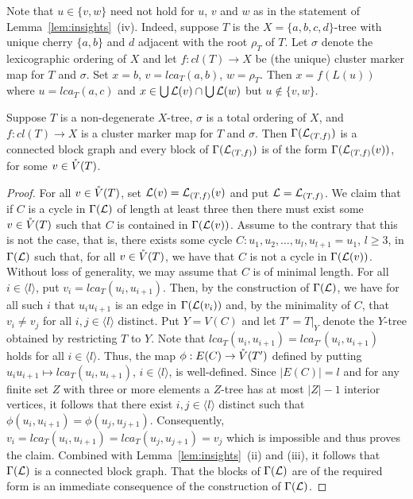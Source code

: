 Note that $u\in \{v,w\}$ need not hold for $u$, $v$ and $w$ as in the
statement of Lemma~\ref{lem:insights}~(iv).  Indeed, suppose $T$ is the
$X=\{a,b,c,d\}$-tree with unique cherry $\{a,b\}$ and $d$ adjacent with the
root $\rho_T$ of $T$. Let $\sigma$ denote the lexicographic ordering of $X$
and let $f:cl(T)\to X$ be (the unique) cluster marker map for $T$ and
$\sigma$.  Set $x=b$, $v=lca_T(a,b)$, $w=\rho_T$.  Then $x=f(L(u))$ where
$u=lca_T(a,c)$ and $x\in \bigcup{\mathcal L}(v)\cap \bigcup{\mathcal L}(w)$ but $u\not\in
\{v,w\}$.

\begin{pro}
  \label{prop:block}
  Suppose $T$ is a non-degenerate $X$-tree, $\sigma$ is a total ordering of
  $X$, and $f:cl(T)\to X$ is a cluster marker map for $T$ and $\sigma$. Then
  $\Gamma({\mathcal L}_{(T,f)})$ is a connected block graph and every block of
  $\Gamma({\mathcal L}_{(T,f)})$ is of the form $\Gamma({\mathcal L}_{(T,f)}(v))$, for some
  $v\in \mathring{V}(T)$.
\end{pro}
\begin{proof}
  For all $v\in \mathring{V}(T)$, set ${\mathcal L}(v)={\mathcal L}_{(T,f)}(v)$ and put
  ${\mathcal L}={\mathcal L}_{(T,f)}$.  We claim that if $C$ is a cycle in $\Gamma({\mathcal L})$ of
  length at least three then there must exist some $v\in \mathring{V}(T)$ such that $C$
  is contained in $\Gamma({\mathcal L}(v))$. Assume to the contrary that this is not
  the case, that is, there exists some cycle $C:u_1,u_2,\ldots,
  u_l,u_{l+1}=u_1$, $l\geq 3$, in $\Gamma({\mathcal L})$ such that, for all $v\in
  \mathring{V}(T)$, we have that $C$ is not a cycle in $\Gamma({\mathcal L}(v))$. Without loss
  of generality, we may assume that $C$ is of minimal length. For all
  $i\in\langle l\rangle$, put $v_i=lca_T(u_i,u_{i+1})$. Then, by the
  construction of $\Gamma({\mathcal L})$, we have for all such $i$ that $u_iu_{i+1}$ is
  an edge in $\Gamma({\mathcal L}(v_i))$ and, by the minimality of $C$, that
  $v_i\not=v_j$ for all $i,j\in\langle l\rangle$ distinct. Put $Y=V(C)$ and
  let $T'=T|_Y$ denote the $Y$-tree obtained by restricting $T$ to $Y$. Note
  that $lca_T(u_i,u_{i+1})=lca_{T'}(u_i,u_{i+1})$ holds for all $i\in\langle
  l\rangle$.  Thus, the map $\phi:E(C)\to \mathring{V}(T')$ defined by putting
  $u_iu_{i+1}\mapsto lca_{T}(u_i,u_{i+1})$, $i\in\langle l \rangle$, is
  well-defined.  Since $|E(C)|=l$ and for any finite set $Z$ with three or
  more elements a $Z$-tree has at most $|Z|-1$ interior vertices, it follows
  that there exist $i,j\in \langle l \rangle$ distinct such that
  $\phi(u_i,u_{i+1})=\phi(u_j,u_{j+1})$. Consequently,
  $v_i=lca_T(u_i,u_{i+1})=lca_T(u_j,u_{j+1})=v_j$ which is impossible and thus
  proves the claim.  Combined with Lemma~\ref{lem:insights}~(ii) and (iii), it
  follows that $\Gamma({\mathcal L})$ is a connected block graph. That the blocks of
  $\Gamma({\mathcal L})$ are of the required form is an immediate consequence of the
  construction of $\Gamma({\mathcal L})$.
\end{proof}


